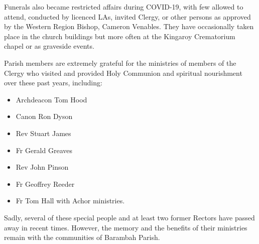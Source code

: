 Funerals also became restricted affairs during COVID-19, with few allowed to attend, conducted by licenced LAs, invited Clergy, or other persons as approved by the Western Region Bishop, Cameron Venables. They have occasionally taken place in the church buildings but more often at the Kingaroy Crematorium chapel or as graveside events.



Parish members are extremely grateful for the ministries of members of the Clergy who visited and provided Holy Communion and spiritual nourishment over these past years, including:



\begin{itemize}

\item

  Archdeacon Tom Hood

\item

  Canon Ron Dyson

\item

  Rev Stuart James

\item

  Fr Gerald Greaves

\item

  Rev John Pinson

\item

  Fr Geoffrey Reeder

\item

  Fr Tom Hall with Achor ministries.

\end{itemize}



\smallskip


Sadly, several of these special people and at least two former Rectors have passed away in recent times. However, the memory and the benefits of their ministries remain with the communities of Barambah Parish.



\printendnotes[custom]
\setcounter{endnote}{0}




